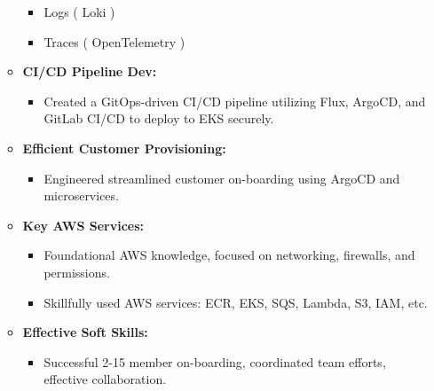 \documentclass[10pt,a4paper]{altacv}
\begin{document}
\begin{itemize}
\begin{itemize}
\begin{itemize}
        \item Logs ( Loki )
        \item Traces ( OpenTelemetry )
  \end{itemize}
\item \textbf{CI/CD Pipeline Dev:}
  \begin{itemize}
    \item Created a GitOps-driven CI/CD pipeline utilizing Flux, ArgoCD, and GitLab CI/CD to deploy to EKS securely. 
  \end{itemize}
\item \textbf{Efficient Customer Provisioning:}
  \begin{itemize}
    \item Engineered streamlined customer on-boarding using ArgoCD and microservices.
  \end{itemize}
\item \textbf{Key AWS Services:}
  \begin{itemize}
  \item Foundational AWS knowledge, focused on networking, firewalls, and permissions.
    \item Skillfully used AWS services: ECR, EKS, SQS, Lambda, S3, IAM, etc.
  \end{itemize}
\item \textbf{Effective Soft Skills:}
  \begin{itemize}
    \item Successful 2-15 member on-boarding, coordinated team efforts, effective collaboration.
  \end{itemize}
  \end{itemize}
\end{itemize}
\end{document}
